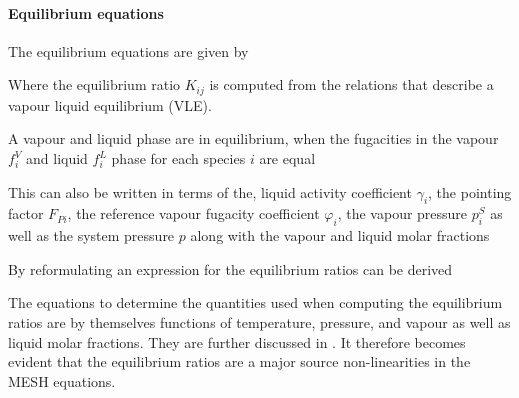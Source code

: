     \paragraph{Equilibrium equations}
        The equilibrium equations are given by

        Where the equilibrium ratio $K_{ij}$ is computed from the relations that describe
        a vapour liquid equilibrium (VLE).

        A vapour and liquid phase are in equilibrium, when the fugacities in the vapour $f_i^V$
        and liquid $f_i^L$ phase for each species $i$ are equal \cite{AndreasPfennig.2003}

        This can also be written in terms of the, liquid activity coefficient $\gamma_i$,
        the pointing factor $F_{Pi}$, the reference vapour fugacity coefficient $\varphi_i$,
        the vapour pressure $p^S_i$ as well as the system pressure $p$ along with the vapour and
        liquid molar fractions

        By reformulating  an expression for the equilibrium ratios
        can be derived

        The equations to determine the quantities used when computing the equilibrium ratios are by
        themselves functions of temperature, pressure, and vapour as well as liquid molar fractions.
        They are further discussed in . It therefore becomes evident that the
        equilibrium ratios are a major source  non-linearities in the MESH equations.

